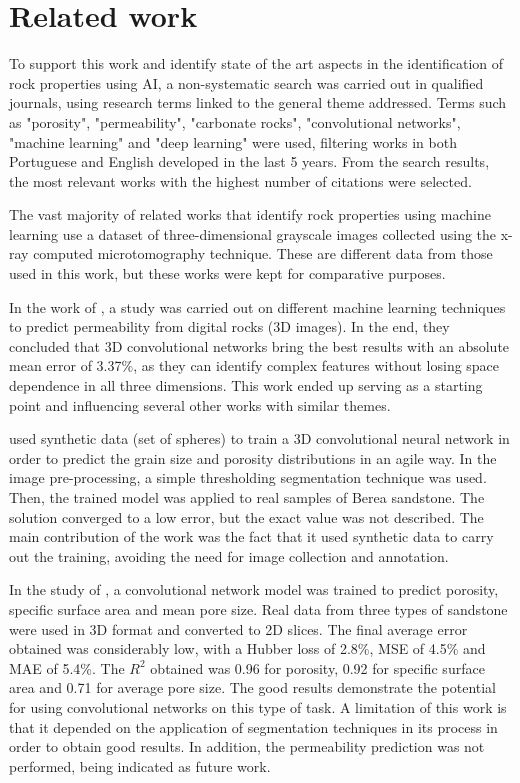 \documentclass[a4paper,fleqn]{cas-sc}
\begin{document}
\section{Related work}

To support this work and identify state of the art aspects in the identification of rock properties using AI, a non-systematic search was carried out in qualified journals, using research terms linked to the general theme addressed. Terms such as "porosity", "permeability", "carbonate rocks", "convolutional networks", "machine learning" and "deep learning" were used, filtering works in both Portuguese and English developed in the last 5 years. From the search results, the most relevant works with the highest number of citations were selected.

The vast majority of related works that identify rock properties using machine learning use a dataset of three-dimensional grayscale images collected using the x-ray computed microtomography technique. These are different data from those used in this work, but these works were kept for comparative purposes.

In the work of , a study was carried out on different machine learning techniques to predict permeability from digital rocks (3D images). In the end, they concluded that 3D convolutional networks bring the best results with an absolute mean error of 3.37\%, as they can identify complex features without losing space dependence in all three dimensions. This work ended up serving as a starting point and influencing several other works with similar themes.

 used synthetic data (set of spheres) to train a 3D convolutional neural network in order to predict the grain size and porosity distributions in an agile way. In the image pre-processing, a simple thresholding segmentation technique was used. Then, the trained model was applied to real samples of Berea sandstone. The solution converged to a low error, but the exact value was not described. The main contribution of the work was the fact that it used synthetic data to carry out the training, avoiding the need for image collection and annotation.

In the study of , a convolutional network model was trained to predict porosity, specific surface area and mean pore size. Real data from three types of sandstone were used in 3D format and converted to 2D slices. The final average error obtained was considerably low, with a Hubber loss of 2.8\%, MSE of 4.5\% and MAE of 5.4\%. The $R^2$ obtained was 0.96 for porosity, 0.92 for specific surface area and 0.71 for average pore size. The good results demonstrate the potential for using convolutional networks on this type of task. A limitation of this work is that it depended on the application of segmentation techniques in its process in order to obtain good results. In addition, the permeability prediction was not performed, being indicated as future work.
\end{document}
